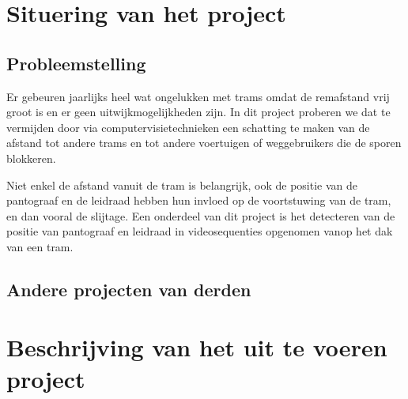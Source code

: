 \documentclass[a4paper,oneside,11pt,final]{memoir}
\begin{document}
\section*{Situering van het project}\label{sec:Situering}

\subsection{Probleemstelling}\label{sec:Probleemstelling}

%

Er gebeuren jaarlijks heel wat ongelukken met trams omdat de remafstand vrij groot is en er geen uitwijkmogelijkheden zijn. In dit project proberen we dat te vermijden door via computervisietechnieken een schatting te maken van de afstand tot andere trams en tot andere voertuigen of weggebruikers die de sporen blokkeren. 

Niet enkel de afstand vanuit de tram is belangrijk, ook de positie van de pantograaf en de leidraad hebben hun invloed op de voortstuwing van de tram, en dan vooral de slijtage. Een onderdeel van dit project is het detecteren van de positie van pantograaf en leidraad in videosequenties opgenomen vanop het dak van een tram.

\subsection{Andere projecten van derden}\label{sec:Andere}


\section*{Beschrijving van het uit te voeren project}\label{sec:Beschrijving}
\end{document}
